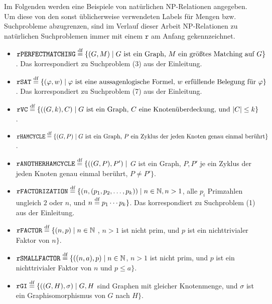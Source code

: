 Im Folgenden werden eine Beispiele von natürlichen NP-Relationen angegeben. Um diese von den sonst üblicherweise verwendeten Labels für Mengen bzw. Suchprobleme abzugrenzen, sind im Verlauf dieser Arbeit NP-Relationen zu natürlichen Suchproblemen immer mit einem $\mathtt{r}$ am Anfang gekennzeichnet.
\begin{itemize}[midpenalty=0]
\item $\mathtt{rPERFECTMATCHING} \stackrel{\text{df}}{=} \{ (G, M) \mid \text{$G$ ist ein Graph, $M$ ein größtes Matching auf $G$} \}$. Das korrespondiert zu Suchproblem (3) aus der Einleitung.
\item $\mathtt{rSAT} \stackrel{\text{df}}{=} \{ (\varphi, w) \mid \text{$\varphi$ ist eine aussagenlogische Formel, $w$ erfüllende Belegung für $\varphi$} \}$. Das korrespondiert zu Suchproblem (7) aus der Einleitung.
\item $\mathtt{rVC} \stackrel{\text{df}}{=} \{ ((G, k), C) \mid \text{$G$ ist ein Graph, $C$ eine Knotenüberdeckung, und $|C|\leq k$} \}$.
\item $\mathtt{rHAMCYCLE} \stackrel{\text{df}}{=} \{ (G, P) \mid \text{$G$ ist ein Graph, $P$ ein Zyklus der jeden Knoten genau einmal berührt} \}$.
\item $\mathtt{rANOTHERHAMCYCLE} \stackrel{\text{df}}{=} \{ ((G, P), P') \mid $ $G$ ist ein Graph, $P, P'$ je ein Zyklus der jeden Knoten genau einmal berührt, $P\neq P' \}$.
\item $\mathtt{rFACTORIZATION} \stackrel{\text{df}}{=} \{ (n, (p_1,p_2,\dots, p_k)) \mid n\in\mathbb N, n>1$, alle $p_i$ Primzahlen ungleich $2$ oder $n$, und $n\stackrel{\text{df}}{=} p_1\cdots p_k \}$. Das korrespondiert zu Suchproblem (1) aus der Einleitung.
\item $\mathtt{rFACTOR} \stackrel{\text{df}}{=} \{ (n, p) \mid n\in\mathbb N$ , $n>1$ ist nicht prim, und $p$ ist ein nichttrivialer Faktor von $n\}$.
\item $\mathtt{rSMALLFACTOR} \stackrel{\text{df}}{=} \{ ((n, a), p) \mid n\in\mathbb N$, $n>1$ ist nicht prim, und $p$ ist ein nichttrivialer Faktor von $n$ und $p\leq a\}$.
\item $\mathtt{rGI} \stackrel{\text{df}}{=} \{ ((G, H), \sigma) \mid G, H$ sind Graphen mit gleicher Knotenmenge, und $\sigma$ ist ein Graphisomorphismus von $G$ nach $H\}$.
\end{itemize}
